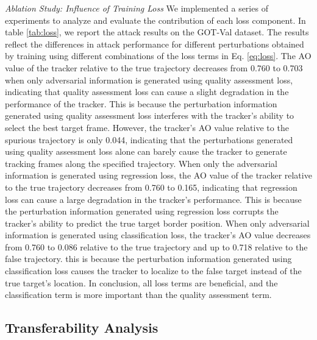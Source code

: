 \documentclass[journal]{IEEEtran}
\begin{document}
\textit{Ablation Study: Influence of Training Loss} We implemented a series of experiments to analyze and evaluate the contribution of each loss component.
In table \ref{tab:loss}, we report the attack results on the GOT-Val dataset. The results reflect the differences in attack performance for different perturbations obtained by training using different combinations of the loss terms in Eq. \ref{eq:loss}.
The AO value of the tracker relative to the true trajectory decreases from 0.760 to 0.703 when only adversarial information is generated using quality assessment loss, indicating that quality assessment loss can cause a slight degradation in the performance of the tracker. This is because the perturbation information generated using quality assessment loss interferes with the tracker's ability to select the best target frame.
However, the tracker's AO value relative to the spurious trajectory is only 0.044, indicating that the perturbations generated using quality assessment loss alone can barely cause the tracker to generate tracking frames along the specified trajectory.
When only the adversarial information is generated using regression loss, the AO value of the tracker relative to the true trajectory decreases from 0.760 to 0.165, indicating that regression loss can cause a large degradation in the tracker's performance. This is because the perturbation information generated using regression loss corrupts the tracker's ability to predict the true target border position.
When only adversarial information is generated using classification loss, the tracker's AO value decreases from 0.760 to 0.086 relative to the true trajectory and up to 0.718 relative to the false trajectory. this is because the perturbation information generated using classification loss causes the tracker to localize to the false target instead of the true target's location.
In conclusion, all loss terms are beneficial, and the classification term is more important than the quality assessment term.

\subsection{Transferability Analysis}
\end{document}
